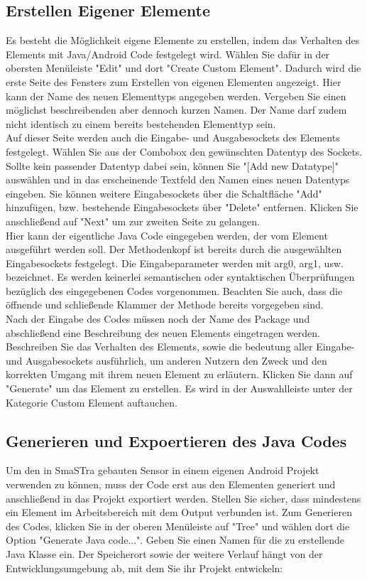 \subsection{Erstellen Eigener Elemente} \label{sub:Eigene_Elemente}
Es besteht die M\"oglichkeit eigene Elemente zu erstellen, indem das Verhalten des Elements mit Java/Android Code festgelegt wird. W\"ahlen Sie daf\"ur in der obersten Men\"uleiste "Edit" und dort "Create Custom Element". Dadurch wird die erste Seite des Fensters zum Erstellen von eigenen Elementen angezeigt. Hier kann der Name des neuen Elementtyps angegeben werden. Vergeben Sie einen m\"oglichst beschreibenden aber dennoch kurzen Namen. Der Name darf zudem nicht identisch zu einem bereits bestehenden Elementtyp sein.
\\
Auf dieser Seite werden auch die Eingabe- und Ausgabesockets des Elements festgelegt. W\"ahlen Sie aus der Combobox den gew\"unschten Datentyp des Sockets. Sollte kein passender Datentyp dabei sein, k\"onnen Sie "[Add new Datatype]" ausw\"ahlen und in das erscheinende Textfeld den Namen eines neuen Datentyps eingeben. Sie k\"onnen weitere Eingabesockets \"uber die Schaltfl\"ache "Add" hinzuf\"ugen, bzw. bestehende Eingabesockets \"uber "Delete" entfernen. Klicken Sie anschlie{\ss}end auf "Next" um zur zweiten Seite zu gelangen.
\\
Hier kann der eigentliche Java Code eingegeben werden, der vom Element ausgef\"uhrt werden soll. Der Methodenkopf ist bereits durch die ausgew\"ahlten Eingabesockets festgelegt. Die Eingabeparameter werden mit arg0, arg1, usw. bezeichnet. Es werden keinerlei semantischen oder syntaktischen \"Uberpr\"ufungen bez\"uglich des eingegebenen Codes vorgenommen. Beachten Sie auch, dass die \"offnende und schlie{\ss}ende Klammer der Methode bereits vorgegeben sind.
\\
Nach der Eingabe des Codes m\"ussen noch der Name des Package und abschlie{\ss}end eine Beschreibung des neuen Elements eingetragen werden. Beschreiben Sie das Verhalten des Elements, sowie die bedeutung aller Eingabe- und Ausgabesockets ausf\"uhrlich, um anderen Nutzern den Zweck und den korrekten Umgang mit ihrem neuen Element zu erl\"autern.
Klicken Sie dann auf "Generate" um das Element zu erstellen. Es wird in der Auswahlleiste unter der Kategorie Custom Element auftauchen.


\subsection{Generieren und Expoertieren des Java Codes} \label{sub:Generate}
Um den in SmaSTra gebauten Sensor in einem eigenen Android Projekt verwenden zu k\"onnen, muss der Code erst aus den Elementen generiert und anschlie{\ss}end in das Projekt exportiert werden. Stellen Sie sicher, dass mindestens ein Element im Arbeitsbereich mit dem Output verbunden ist. Zum Generieren des Codes, klicken Sie in der oberen Men\"uleiste auf "Tree" und w\"ahlen dort die Option "Generate Java code...". Geben Sie einen Namen f\"ur die zu erstellende Java Klasse ein. Der Speicherort sowie der weitere Verlauf h\"angt von der Entwicklungsumgebung ab, mit dem Sie ihr Projekt entwickeln:

